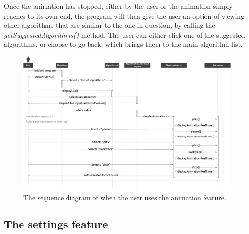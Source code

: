 Once the animation has stopped, either by the user or the animation simply reaches to its own end, the program will then give the user an option of viewing other algorithms that are similar to the one in question, by calling the \textit{getSuggestedAlgorithms()} method. The user can either click one of the suggested algorithms, or choose to go back, which brings them to the main algorithm list.

\begin{landscape}
\begin{figure}[H]
\centering
\includegraphics[scale=0.55]{images/report_images/sequenceDiagramShowAlgorithmList.png}
\caption{The sequence diagram of when the user uses the animation feature.}
\label{sequenceDiagramShowAlgorithmList}
\end{figure}
\end{landscape}

\newpage

\subsection{The settings feature}

